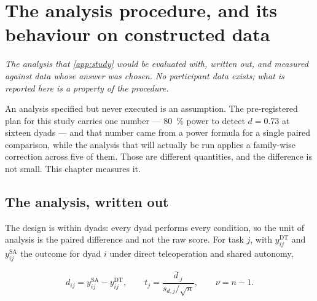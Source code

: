 \chapter{The analysis procedure, and its behaviour on constructed data}
\label{app:analysis}

\noindent\emph{The analysis that \cref{app:study} would be evaluated with,
written out, and measured against data whose answer was chosen. No
participant data exists; what is reported here is a property of the
procedure.}

\label{ch:participant}

\noindent
{}

\bigskip

An analysis specified but never executed is an assumption. The pre-registered
plan for this study carries one number --- \SI{80}{\percent} power to detect
$d = \num{0.73}$ at sixteen dyads --- and that number came from a power
formula for a single paired comparison, while the analysis that will actually
be run applies a family-wise correction across five of them. Those are
different quantities, and the difference is not small. This chapter measures
it.

\section{The analysis, written out}
\label{sec:analysis-spec}

The design is within dyads: every dyad performs every condition, so the unit
of analysis is the paired difference and not the raw score. For task $j$, with
$y^{\text{DT}}_{ij}$ and $y^{\text{SA}}_{ij}$ the outcome for dyad $i$ under
direct teleoperation and shared autonomy,

\begin{equation}
  \label{eq:paired-diff}
  d_{ij} = y^{\text{SA}}_{ij} - y^{\text{DT}}_{ij},
  \qquad
  t_j = \frac{\bar{d}_{\cdot j}}{s_{d,j}/\sqrt{n}},
  \qquad
  \nu = n - 1 .
\end{equation}


